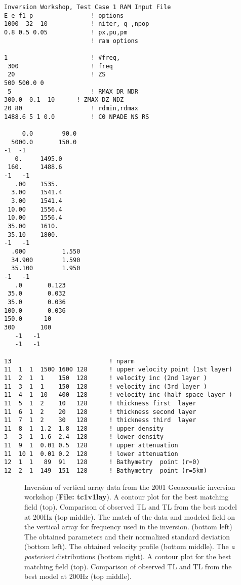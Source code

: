 \documentclass{saclantc}
\begin{document}
\small
\begin{verbatim}
Inversion Workshop, Test Case 1 RAM Input File
E e f1 p                ! options
1000  32  10            ! niter, q ,npop
0.8 0.5 0.05            ! px,pu,pm
                        ! ram options

1                       ! #freq, 
 300                    ! freq
 20                     ! ZS
500 500.0 0
 5                      ! RMAX DR NDR
300.0  0.1  10		! ZMAX DZ NDZ
20 80                   ! rdmin,rdmax
1488.6 5 1 0.0          ! C0 NPADE NS RS

     0.0        90.0
  5000.0       150.0
-1  -1
   0.     1495.0
 160.     1488.6
-1   -1
   .00    1535.
  3.00    1541.4
  3.00    1541.4
 10.00    1556.4
 10.00    1556.4
 35.00    1610.
 35.10    1800.
-1   -1
  .000          1.550
  34.900        1.590
  35.100        1.950
-1   -1
   .0       0.123
 35.0       0.032
 35.0       0.036
100.0       0.036
150.0      10
300       100
   -1   -1
   -1   -1

13                           ! nparm 
11  1  1  1500 1600 128      ! upper velocity point (1st layer)
11  2  1  1    150  128      ! velocity inc (2nd layer )
11  3  1  1    150  128      ! velocity inc (3rd layer )
11  4  1  10   400  128      ! velocity inc (half space layer )
11  5  1  2    10   128      ! thickness first  layer 
11  6  1  2    20   128      ! thickness second layer 
11  7  1  2    30   128      ! thickness third  layer 
11  8  1  1.2  1.8  128      ! upper density
3   3  1  1.6  2.4  128      ! lower density
11  9  1  0.01 0.5  128      ! upper attenuation
11  10 1  0.01 0.2  128      ! lower attenuation
12  1  1   89  91   128      ! Bathymetry  point (r=0)
12  2  1  149  151  128      ! Bathymetry  point (r=5km)
\end{verbatim}
\normalsize
\begin{figure}
\epsfxsize=15cm
\centerline{}
\caption{Inversion of vertical array data from the 2001 Geoacoustic
inversion workshop ({\bf File: tc1v1lay}). A contour plot for the best
matching field (top).
Comparison of observed TL and TL from the best model at 200Hz (top
middle).  
The match of the data and modeled field on the vertical array
for frequency used in the inversion. 
 (bottom left)
The obtained parameters and their normalized standard deviation
(bottom left). The obtained velocity profile (bottom middle). The
{\it a posteriori} distributions (bottom right). A contour plot for the best matching field
(top).
Comparison of observed TL and TL from the best model at 200Hz (top
middle).  }
\label{fig:tc1v1lay}
\end{figure}
\end{document}
